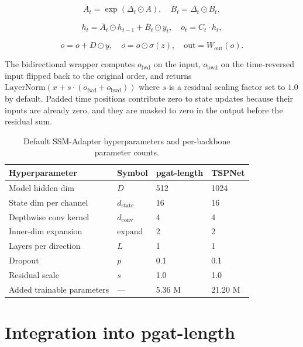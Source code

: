 \begin{equation}
\bar{A}_t = \exp(\Delta_t \odot A), \quad \bar{B}_t = \Delta_t \odot B_t,
\end{equation}

\begin{equation}
h_t = \bar{A}_t \odot h_{t-1} + \bar{B}_t \odot y_t, \quad o_t = C_t \cdot h_t,
\end{equation}

\begin{equation}
o = o + D \odot y, \quad o = o \odot \sigma(z), \quad \text{out} = W_{\text{out}}(o).
\end{equation}

The bidirectional wrapper computes $o_{\text{fwd}}$ on the input, $o_{\text{bwd}}$ on the time-reversed input flipped back to the original order, and returns $\mathrm{LayerNorm}(x + s \cdot (o_{\text{fwd}} + o_{\text{bwd}}))$ where $s$ is a residual scaling factor set to $1.0$ by default. Padded time positions contribute zero to state updates because their inputs are already zero, and they are masked to zero in the output before the residual sum.

\begin{table}[h]
\caption{Default SSM-Adapter hyperparameters and per-backbone parameter counts.}
\begin{center}
\begin{tabular}{p{1.8in}p{1.4in}p{1.4in}p{1.4in}}
\toprule
Hyperparameter & Symbol & pgat-length & TSPNet \\
\midrule
Model hidden dim & $D$ & 512 & 1024 \\
State dim per channel & $d_{\text{state}}$ & 16 & 16 \\
Depthwise conv kernel & $d_{\text{conv}}$ & 4 & 4 \\
Inner-dim expansion & $\text{expand}$ & 2 & 2 \\
Layers per direction & $L$ & 1 & 1 \\
Dropout & $p$ & 0.1 & 0.1 \\
Residual scale & $s$ & 1.0 & 1.0 \\
Added trainable parameters & --- & 5.36 M & 21.20 M \\
\bottomrule
\end{tabular}
\label{tab:adapter-hyperparams}
\end{center}
\end{table}

\section{Integration into pgat-length}


